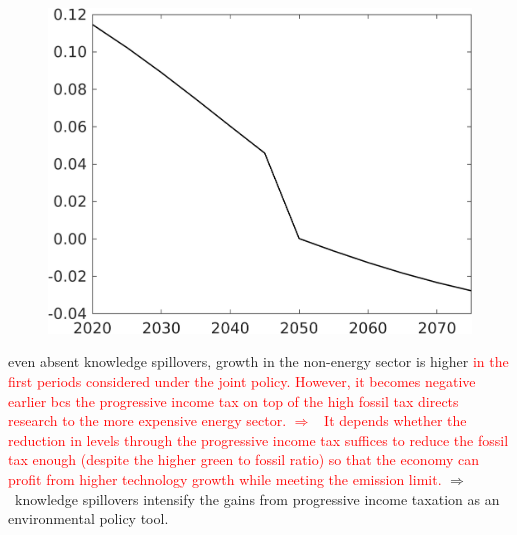 \documentclass[12pt]{article}
\newcommand{\ar}{$\Rightarrow$ \ }
\newcommand{\tr}[1]{\textcolor{red}{#1}}
\begin{document}
\begin{figure}[h!!]
\begin{minipage}[]{0.32\textwidth}
	\end{minipage}		
	\begin{minipage}[]{0.32\textwidth}
		\includegraphics[width=1\textwidth]{../../codding_model/own_basedOnFried/optimalPol_010922_revision/figures/all_13Sept22/CompTaufPER_bytaul_Equlab_Reg0_EY_spillover0_nsk0_xgr0_knspil1_sep0_LFlimit1_emsbase0_countec0_GovRev0_etaa0.79_lgd0.png}
	\end{minipage}	
\end{figure}
even absent knowledge spillovers, growth in the non-energy sector is higher \tr{in the first periods considered under the joint policy. However, it becomes negative earlier bcs the progressive income tax on top of the high fossil tax directs research to the more expensive energy sector. \ar It depends whether the reduction in levels through the progressive income tax suffices to reduce the fossil tax enough (despite the higher green to fossil ratio) so that the economy can profit from higher technology growth while meeting the emission limit.}
\ar knowledge spillovers intensify the gains from progressive income taxation as an environmental policy tool. 
\end{document}
